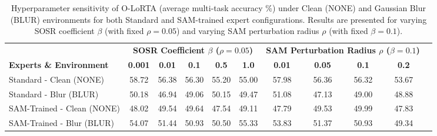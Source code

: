 \documentclass{article}
\theoremstyle{plain}
\theoremstyle{definition}
\theoremstyle{remark}
\begin{document}
\begin{table}[t]
\centering
\caption{Hyperparameter sensitivity of O-LoRTA (average multi-task accuracy \%) under Clean (NONE) and Gaussian Blur (BLUR) environments for both Standard and SAM-trained expert configurations. Results are presented for varying SOSR coefficient $\beta$ (with fixed $\rho=0.05$) and varying SAM perturbation radius $\rho$ (with fixed $\beta=0.1$).}
\label{tab:ablation_results}
\footnotesize
\vspace{-8pt}
\begin{tabular}{lcccccccccc}
\toprule
& \multicolumn{5}{c}{\textbf{SOSR Coefficient $\beta$ ($\rho=0.05$)}} & \multicolumn{4}{c}{\textbf{SAM Perturbation Radius $\rho$ ($\beta=0.1$)}} \\
\cmidrule(r){2-6} \cmidrule(l){7-10}
\textbf{Experts \& Environment} & \textbf{0.001} & \textbf{0.01} & \textbf{0.1} & \textbf{0.5} & \textbf{1.0} & \textbf{0.01} & \textbf{0.05} & \textbf{0.1} & \textbf{0.2} \\
\midrule
Standard - Clean (NONE) & 58.72 & 56.38 & 56.30 & 55.20 & 55.00 & 57.98 & 56.36 & 56.32 & 53.67 \\
Standard - Blur (BLUR)  & 50.18 & 46.94 & 49.06 & 50.15 & 49.47 & 51.08 & 47.13 & 49.00 & 48.88 \\
SAM-Trained - Clean (NONE) & 48.02 & 49.54 & 49.64 & 47.54 & 49.11 & 47.79 & 49.53 & 49.99 & 47.83 \\
SAM-Trained - Blur (BLUR)  & 54.07 & 51.44 & 50.93 & 50.50 & 55.33 & 53.83 & 51.37 & 50.93 & 49.34 \\
\bottomrule
\end{tabular}
\vspace{-8pt}
\end{table}
\end{document}
